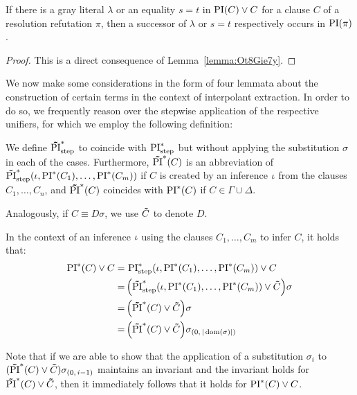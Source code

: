\documentclass[%
	draft=false,%
	numbers=noendperiod,%
	11pt,%
	a4paper,%
	oneside,%
	openany,%
]{memoir}
\begin{document}
\begin{corr}
	\label{lemma:gray_lits_and_eq_all_in_PI}
	If there is a gray literal $\lambda$ or an equality $s=t$ in $\operatorname{PI}(C) \lor C$ for a clause $C$ of a resolution refutation $\pi$,
	then a successor of $\lambda$ or $s=t$ respectively occurs in $\operatorname{PI}(\pi)$.
\end{corr}
\begin{proof}
	This is a direct consequence of Lemma~\ref{lemma:Ot8Gie7y}.
\end{proof}



We now make some considerations in the form of four lemmata about the construction of certain terms in the context of interpolant extraction.
In order to do so, we frequently reason over the stepwise application of the respective unifiers, for which we employ the following definition:

\begin{defi}
	We define $\bm\tilde{\operatorname{PI}}^{*}_{\mathrm{step}}$ to coincide with $\operatorname{PI}_{\mathrm{step}}^*$ but without applying the substitution $\sigma$ in each of the cases.
	Furthermore, $\bm\tilde{\operatorname{PI}}^{*}(C)$ is an abbreviation of $\bm\tilde{\operatorname{PI}}^{*}_{\mathrm{step}}(\iota, \operatorname{PI}^*(C_1), \dots, \operatorname{PI}^*(C_m))$ if $C$ is created by an inference $\iota$ from the clauses $C_1, \dots, C_n$,
	and $\bm\tilde{\operatorname{PI}}^{*}(C)$ coincides with $\operatorname{PI}^*(C)$ if $C\in \Gamma\cup\Delta$.

	Analogously, if $C \equiv D\sigma$, we use $\bm\tilde{C}$ to denote\nolinebreak{} $D$.
\end{defi}

In the context of an inference $\iota$ using the clauses $C_1, \dots, C_m$ to infer $C$, it holds that:
\begin{align*}
	 \operatorname{PI}^*(C) \lor C 
	 =\,& \operatorname{PI}_{\mathrm{step}}^*(\iota, \operatorname{PI}^*(C_1), \dots, \operatorname{PI}^*(C_m)) \lor C  \\
	=\, & \Big(\bm\tilde{\operatorname{PI}}^{*}_{\mathrm{step}}(\iota, \operatorname{PI}^*(C_1), \dots, \operatorname{PI}^*(C_m)) \lor \bm\tilde{C} \Big) \sigma  \\
	=\, & \Big(\bm\tilde{\operatorname{PI}}^{*}(C)\lor \bm\tilde{C} \Big) \sigma  \\
	=\,& \Big(\bm\tilde{\operatorname{PI}}^{*}(C)\lor \bm\tilde{C} \Big) \sigma_{(0,\,|\operatorname{dom}(\sigma)|)}
\end{align*}


\newcommand{\inv}{\ensuremath{\PIstarnosigma(C)\lor \nosigma{C}}}
\newcommand{\invp}{\ensuremath{(\inv)}}


Note that if we are able to show that the application of a substitution $\sigma_i$ to $\invp\sigmazmi$ maintains an invariant and the invariant holds for $\inv$, then it immediately follows that it holds for $\operatorname{PI}^*(C) \lor C$. 
\end{document}
